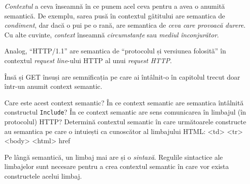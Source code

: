 \textsl{Contextul} a ceva înseamnă în ce punem acel ceva pentru a
avea o anumită semantică. De exemplu, sarea pusă în contextul
gătitului are semantica de \textit{condiment}, dar dacă
o pui pe o rană, are semantica de \textit{ceva care provoacă durere}.
Cu alte cuvinte, \textsl{context} înseamnă
\textsl{circumstanțe} sau \textsl{mediul înconjurător}. 

Analog, ``HTTP/1.1'' are semantica de ``protocolul și versiunea folosită''
în contextul \textit{request line}-ului HTTP al unui \textit{request HTTP}.

\begin{Exercise}[title={Întrebări de sinteză},difficulty=2]
Însă și GET însuși are semnificația pe care ai întâlnit-o în capitolul
trecut doar într-un anumit context semantic.

\Question Care este acest context semantic?
\Question În ce context semantic are semantica întâlnită constructul \texttt{Include}?
\Question În ce context semantic are sens comunicarea în limbajul (în protocolul) HTTP?
\ExeText Determină contextul semantic în care următoarele constructe au semantica pe
care o intuiești ca cunoscător al limbajului HTML:
\Question <td>
\Question <tr>
\Question <body>
\Question <html>
\Question href
\end{Exercise}


Pe lângă semantică, un limbaj mai are și o \textsl{sintaxă}. Regulile sintactice
ale limbajelor sunt necesare pentru a crea contextul semantic în
care vor exista constructele acelui limbaj.

